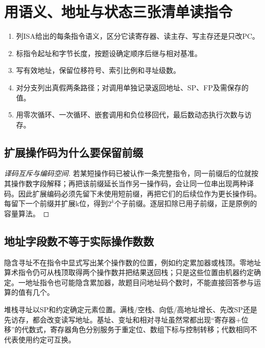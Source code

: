 \section{用语义、地址与状态三张清单读指令}\label{CO04-method}

\begin{methodbox}[机器级代码五步法]

\begin{enumerate}
\def\labelenumi{\arabic{enumi}.}
\tightlist
\item
  列ISA给出的每条指令语义，区分它读寄存器、读主存、写主存还是只改PC。
\item
  标指令起址和字节长度，按题设确定顺序后继与相对基准。
\item
  写有效地址，保留位移符号、索引比例和寻址级数。
\item
  对分支列出真假两条路径；对调用单独记录返回地址、SP、FP及需保存的值。
\item
  用零次循环、一次循环、嵌套调用和负位移回代，最后数动态执行次数与访存。
\end{enumerate}

\end{methodbox}

\subsection{扩展操作码为什么要保留前缀}\label{CO04-proof}

\begin{proof}[译码互斥与编码空间]

若某短操作码已被认作一条完整指令，同一前缀后的位就按其操作数字段解释；再把该前缀延长当作另一操作码，会让同一位串出现两种译码。因此扩展编码必须先留下未使用短前缀，再把它们的后续位作为更长操作码。每留下一个前缀并扩展k位，得到\(2^k\)个子前缀。逐层扣除已用子前缀，正是原例的容量算法。

\end{proof}

\subsection{地址字段数不等于实际操作数数}\label{CO04-implicit}

隐含寻址不在指令中显式写出某个操作数的位置，例如约定累加器或栈顶。零地址算术指令仍可从栈顶取得两个操作数并把结果送回栈；只是这些位置由机器约定确定。一地址指令也可能隐含累加器，故题目问地址码个数时，不能直接回答参与运算的值有几个。

堆栈寻址以SP和约定确定元素位置。满栈/空栈、向低/高地址增长、先改SP还是先访存，都会改变读写地址。基址、变址和相对寻址虽然常都出现``寄存器+位移''的代数式，寄存器角色分别服务于重定位、数组下标与控制转移；代数相同不代表使用约定可互换。

